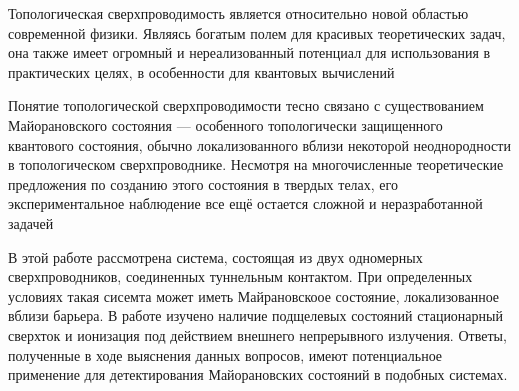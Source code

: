 Топологическая сверхпроводимость является относительно новой областью современной физики. Являясь богатым полем для красивых теоретических задач, она также имеет огромный и нереализованный потенциал для использования в практических целях, в особенности для квантовых вычислений


Понятие топологической сверхпроводимости тесно связано с существованием Майорановского состояния --- особенного топологически защищенного квантового состояния, обычно локализованного вблизи некоторой неоднородности в топологическом сверхпроводнике. Несмотря на многочисленные теоретические предложения по созданию этого состояния в твердых телах, его экспериментальное наблюдение все ещё остается сложной и неразработанной задачей

В этой работе рассмотрена система, состоящая из двух одномерных сверхпроводников, соединенных туннельным контактом. При определенных условиях такая сисемта может иметь Майрановскоое состояние, локализованное вблизи барьера. В работе изучено наличие подщелевых состояний стационарный сверхток и ионизация под действием внешнего непрерывного излучения. Ответы, полученные в ходе выяснения данных вопросов, имеют потенциальное применение для детектирования Майорановских состояний в подобных системах.